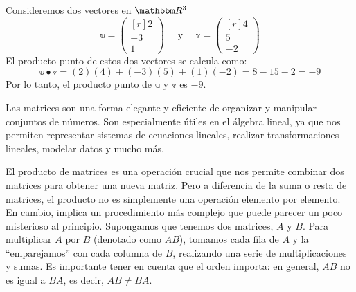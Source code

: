 \begin{example}
    Consideremos dos vectores en $\RR[3]$
    $$\mathbb{u} = \begin{pmatrix*}[r] 2 \\ -3 \\ 1 \end{pmatrix*} \quad \text{ y } \quad \mathbb{v} = \begin{pmatrix*}[r] 4 \\ 5 \\ -2 \end{pmatrix*}$$
    El producto punto de estos dos vectores se calcula como:
    $$\mathbb{u} \bullet \mathbb{v} = (2)(4) + (-3)(5) + (1)(-2) = 8 - 15 - 2 = -9$$
    Por lo tanto, el producto punto de \(\mathbb{u}\) y \(\mathbb{v}\) es \(-9\).
\end{example}

Las matrices son una forma elegante y eficiente de organizar y manipular conjuntos de números. Son especialmente útiles en el álgebra lineal, ya que nos permiten representar sistemas de ecuaciones lineales, realizar transformaciones lineales, modelar datos y mucho más.
    
El producto de matrices es una operación crucial que nos permite combinar dos matrices para obtener una nueva matriz. Pero a diferencia de la suma o resta de matrices, el producto no es simplemente una operación elemento por elemento. En cambio, implica un procedimiento más complejo que puede parecer un poco misterioso al principio. Supongamos que tenemos dos matrices, $A$ y $B$. Para multiplicar $A$ por $B$ (denotado como $AB$), tomamos cada fila de $A$ y la “emparejamos” con cada columna de $B$, realizando una serie de multiplicaciones y sumas. Es importante tener en cuenta que el orden importa: en general, $AB$ no es igual a $BA$, es decir, $AB \neq BA$.
    
